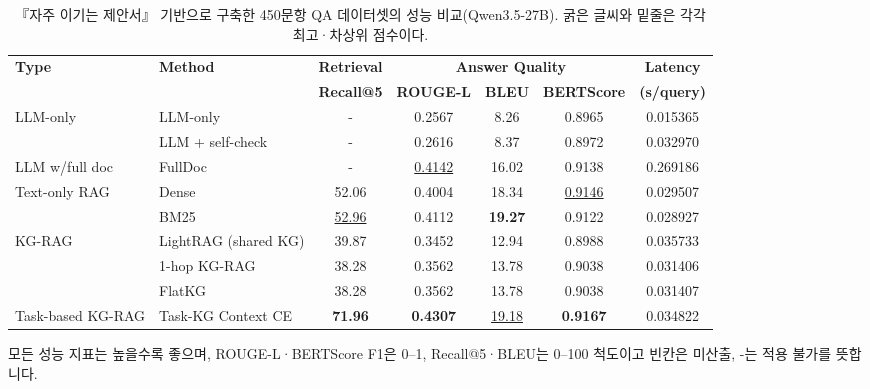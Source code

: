 \begin{table}[t]
\centering
\footnotesize
\caption{『자주 이기는 제안서』 기반으로 구축한 450문항 QA 데이터셋의 성능 비교(Qwen3.5-27B). 굵은 글씨와 밑줄은 각각 최고·차상위 점수이다.}
\label{tab:jaije-main}
\renewcommand{\arraystretch}{1.2}
\setlength{\tabcolsep}{3pt}
\begin{tabular}{llccccc}
\toprule
\multirow{2}{*}{\textbf{Type}} & \multirow{2}{*}{\textbf{Method}} & \textbf{Retrieval} & \multicolumn{3}{c}{\textbf{Answer Quality}} & \textbf{Latency} \\
\cmidrule(lr){3-3}\cmidrule(lr){4-6}\cmidrule(lr){7-7}
 & & \textbf{Recall@5} & \textbf{ROUGE-L} & \textbf{BLEU} & \textbf{BERTScore} & \textbf{(s/query)} \\
\midrule
\multirow{2}{*}{LLM-only} & LLM-only & - & 0.2567 & 8.26 & 0.8965 & 0.015365 \\
 & LLM + self-check & - & 0.2616 & 8.37 & 0.8972 & 0.032970 \\
\midrule
LLM w/full doc & FullDoc & - & \uline{0.4142} & 16.02 & 0.9138 & 0.269186 \\
\midrule
\multirow{2}{*}{Text-only RAG} & Dense & 52.06 & 0.4004 & 18.34 & \uline{0.9146} & 0.029507 \\
 & BM25 & \uline{52.96} & 0.4112 & \textbf{19.27} & 0.9122 & 0.028927 \\
\midrule
\multirow{3}{*}{KG-RAG} & LightRAG (shared KG) & 39.87 & 0.3452 & 12.94 & 0.8988 & 0.035733 \\
 & 1-hop KG-RAG & 38.28 & 0.3562 & 13.78 & 0.9038 & 0.031406 \\
 & FlatKG & 38.28 & 0.3562 & 13.78 & 0.9038 & 0.031407 \\
\midrule
\rowcolor[HTML]{EAF5E9}
Task-based KG-RAG & Task-KG Context CE & \textbf{71.96} & \textbf{0.4307} & \uline{19.18} & \textbf{0.9167} & 0.034822 \\
\bottomrule
\end{tabular}
\par\vspace{8pt}
\begin{minipage}{\textwidth}
\scriptsize
모든 성능 지표는 높을수록 좋으며, ROUGE-L·BERTScore F1은 0–1, Recall@5·BLEU는 0–100 척도이고 빈칸은 미산출, -는 적용 불가를 뜻합니다.
\end{minipage}
\end{table}
